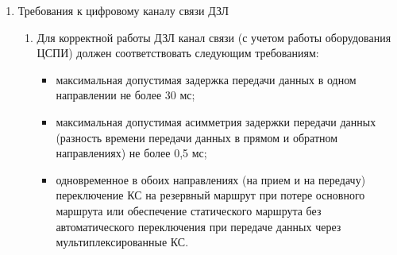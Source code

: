 \begin{enumerate}
\begin{enumerate}



\item В случае обнаружения неисправности одного из каналов связи с удаленным п/к ДЗЛ защита переключается на другой канал связи. При возникновении КЗ на защищаемой линии и одновременном повреждении одного из подключенных к п/к ДЗЛ каналов связи применяемый алгоритм резервирования каналов связи обеспечивает время срабатывания защиты не более 40 мс.
\end{enumerate}

\item Требования к цифровому каналу связи ДЗЛ
\begin{enumerate}
\item Для корректной работы ДЗЛ канал связи (с учетом работы оборудования ЦСПИ) должен соответствовать следующим требованиям:
  \begin{itemize}
    \item максимальная допустимая задержка передачи данных в одном направлении не более 30 мс;
    \item максимальная допустимая асимметрия задержки передачи данных (разность времени передачи данных в прямом и обратном направлениях) не более 0,5 мс;
    \item одновременное в обоих направлениях (на прием и на передачу) переключение КС на резервный маршрут при потере основного маршрута или обеспечение статического маршрута без автоматического переключения при передаче данных через мультиплексированные КС.
  \end{itemize}
\end{enumerate}


\end{enumerate}
